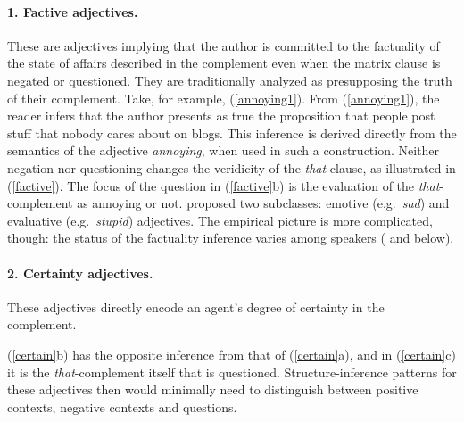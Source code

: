 \documentclass[10pt]{article}
\begin{document}
\paragraph{1. Factive adjectives.} These are adjectives  implying that the author is committed to the factuality of the state of affairs described in the complement even when the matrix clause is negated or questioned. They are traditionally analyzed as presupposing the truth of their complement.
Take, for example, (\ref{annoying1}).
 \vspace{-.1in}
 \vspace{-.1in}
From (\ref{annoying1}), the reader infers that the author presents as true the proposition that people post stuff that nobody cares about on blogs.
This inference is derived directly from the semantics of the adjective {\it annoying}, when used in such a construction. 
Neither negation nor questioning changes the veridicity of the \emph{that }clause, as illustrated in (\ref{factive}).  The focus of the question in (\ref{factive}b) is the evaluation of the \textit{that}-complement as annoying or not.
 \vspace{-.1in}
 \vspace{-.1in}
\cite{norrick:1978} proposed two subclasses: emotive (e.g.\ \textit{sad}) and evaluative (e.g.\ \textit{stupid}) adjectives. The empirical picture is more complicated, though: the status of the factuality inference varies among speakers (\cite{csli-gang-cssp13} and below).
\vspace{-.2in}
\paragraph{2. Certainty adjectives.} \hspace{-.1in}These adjectives directly encode an agent's degree of certainty in the complement.

\vspace{-0.5em}
 \vspace{-0.5em} 
(\ref{certain}b) has the opposite inference from that of
 (\ref{certain}a), and 
in (\ref{certain}c) it is the
 \textit{that}-complement itself that is questioned. 
Structure-inference patterns for these adjectives
 then would minimally need to distinguish between positive contexts, negative
 contexts and questions.
\end{document}
